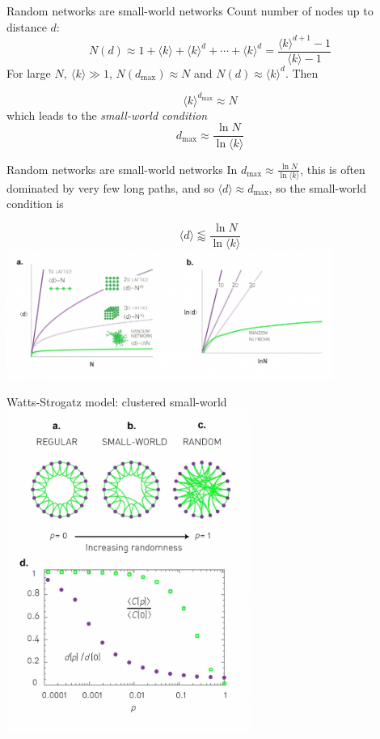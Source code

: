 \documentclass[notes]{beamer}
\begin{document}
\begin{frame}{Random networks are small-world networks}
  \centering
  Count number of nodes up to distance $d$:
  \[
    N(d) \approx 
      1 + \langle k \rangle + \langle k \rangle^d + \cdots + \langle k \rangle^d =
      \frac{\langle k \rangle^{d+1} - 1}{\langle k \rangle - 1}
  \]
  For large $N,~\langle k \rangle \gg 1$, $N(d_{\max}) \approx N$ and 
  $N(d) \approx \langle k \rangle^d$. Then 

  \[\langle k \rangle^{d_{\max}} \approx N\]
  which leads to the \emph{small-world condition}
  \[d_{\max} \approx \frac{\ln N}{\ln \langle k \rangle}\]
\end{frame}

\begin{frame}{Random networks are small-world networks}
  In $d_{\max} \approx \frac{\ln N}{\ln \langle k \rangle}$, this is often
  dominated by very few long paths, and so $\langle d \rangle \approx d_{\max}$,
  so the small-world condition is

  \[
    \langle d \rangle \lessapprox \frac{\ln N}{\ln \langle k \rangle}
  \]
  \centering
  \includegraphics[width=0.8\textwidth]{Figures/randomSmallWorld.jpg} 
\end{frame}

\begin{frame}{Watts-Strogatz model: clustered small-world}
  \vspace{-1em}
  \centering
  \includegraphics[width=0.6\textwidth]{Figures/wattsStrogatz.jpg}
\end{frame}
\end{document}

